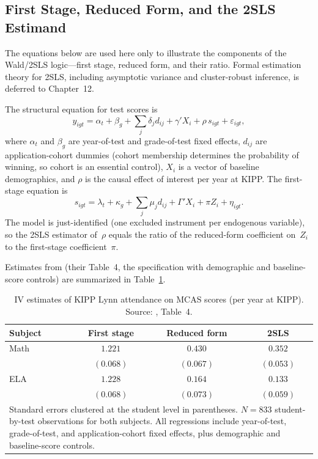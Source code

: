 \documentclass[master.tex]{subfiles}
\begin{document}
\subsection{First Stage, Reduced Form, and the 2SLS Estimand}

The equations below are used here only to illustrate the components
of the Wald/2SLS logic---first stage, reduced form, and their ratio.
Formal estimation theory for 2SLS, including asymptotic variance and
cluster-robust inference, is deferred to Chapter~12.

The structural equation for test scores is
\begin{equation}
  y_{igt} = \alpha_t + \beta_g + \sum_j \delta_j d_{ij}
            + \gamma' X_i + \rho\, s_{igt} + \varepsilon_{igt},
  \label{w7:eq:kipp-structural}
\end{equation}
where $\alpha_t$ and $\beta_g$ are year-of-test and grade-of-test
fixed effects, $d_{ij}$ are application-cohort dummies
(cohort membership determines the probability of winning, so cohort
is an essential control), $X_i$ is a vector of baseline demographics,
and $\rho$ is the causal effect of interest per year at KIPP.  The
first-stage equation is
\begin{equation}
  s_{igt} = \lambda_t + \kappa_g + \sum_j \mu_j d_{ij}
            + \Gamma' X_i + \pi Z_i + \eta_{igt}.
  \label{w7:eq:kipp-firststage}
\end{equation}
The model is just-identified (one excluded instrument per endogenous
variable), so the 2SLS estimator of~$\rho$ equals the ratio of the
reduced-form coefficient on~$Z_i$ to the first-stage coefficient~$\pi$.

Estimates from \citet{angrist2012benefits} (their Table~4, the
specification with demographic and baseline-score controls) are
summarized in Table~\ref{w7:tab:kipp}.

\begin{table}[ht]
\centering
\caption{IV estimates of KIPP Lynn attendance on MCAS scores
         (per year at KIPP).
         Source: \citet{angrist2012benefits}, Table~4.}
\label{w7:tab:kipp}
\begin{tabular}{lccc}
\hline\hline
Subject & First stage & Reduced form & 2SLS \\
\hline
Math & $1.221$ & $0.430$ & $0.352$ \\
     & $(0.068)$ & $(0.067)$ & $(0.053)$ \\
ELA  & $1.228$ & $0.164$ & $0.133$ \\
     & $(0.068)$ & $(0.073)$ & $(0.059)$ \\
\hline\hline
\multicolumn{4}{p{0.82\linewidth}}{\small Standard errors clustered at
the student level in parentheses.  $N = 833$ student-by-test
observations for both subjects.  All regressions include year-of-test,
grade-of-test, and application-cohort fixed effects, plus demographic
and baseline-score controls.}
\end{tabular}
\end{table}
\end{document}
